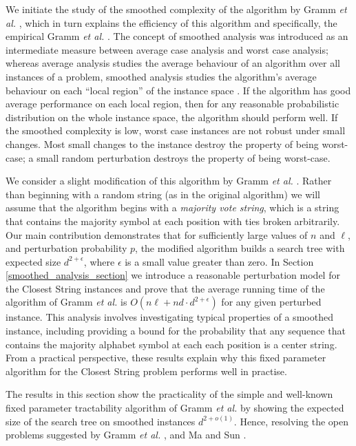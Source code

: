 We initiate the study of the smoothed complexity of the algorithm by Gramm {\em et al.} \cite{GNR03}, which in turn explains the efficiency of this algorithm and specifically, the empirical  Gramm {\em et al.} \cite{GNR03}. The concept of smoothed analysis was introduced as an intermediate measure between average case analysis and worst case analysis; whereas average analysis studies the average behaviour of an algorithm over all instances of a problem, smoothed analysis studies the algorithm's average behaviour on each ``local region'' of the instance space \cite{ST01}.  If the algorithm has good average performance on each local region, then for any reasonable probabilistic distribution on the whole instance space, the algorithm should perform well.  If the smoothed complexity is low, worst case instances are not robust under small changes. Most small changes to the instance destroy the property of being worst-case; a small random perturbation destroys the property of being worst-case. 

We consider a slight modification of this algorithm by Gramm {\em et al.} \cite{GNR03}.  Rather than beginning with a random string (as in the original algorithm) we will assume that the algorithm begins with a {\em majority vote string}, which is a string that contains the majority symbol at each position with ties broken arbitrarily.  Our main contribution demonstrates that for sufficiently large values of $n$ and $\ell$, and perturbation probability $p$, the modified algorithm builds a search tree with expected size $d^{2 + \epsilon}$, where $\epsilon$ is a small value greater than zero. In Section \ref{smoothed_analysis_section} we introduce a reasonable perturbation model for the {\sc Closest String} instances and prove that the average running time of the algorithm of Gramm {\em et al.} \cite{GNR03} is $O(n\ell + nd \cdot d^{2 + \epsilon})$ for any given perturbed instance.  This analysis involves investigating typical properties of a smoothed instance, including providing a bound for the probability that any sequence that contains the majority alphabet symbol at each each position is a center string.  From a practical perspective, these results explain why this fixed parameter algorithm for the {\sc Closest String} problem performs well in practise. 

The results in this section show the practicality of the simple and well-known fixed parameter tractability algorithm of Gramm {\em et al.} \cite{GNR03} by showing the expected size of the search tree on smoothed instances $d^{2 + o(1)}$. Hence, resolving the open problems suggested by Gramm {\em et al.} \cite{GNR03}, and Ma and Sun \cite{MS08}.

